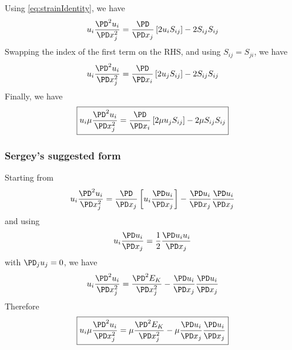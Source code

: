 \documentclass[11pt]{article}
\begin{document}
Using \ref{eq:strainIdentity}, we have
\begin{equation}
	u_i \frac{\PD^2 u_i}{\PD x_j^2} = 
	\frac{\PD}{\PD x_j} \left[ 2 u_i S_{ij} \right] - 
	2 S_{ij} S_{ij}
\end{equation}
Swapping the index of the first term on the RHS, and using $S_{ij}=S_{ji}$, we have
\begin{equation}
	u_i \frac{\PD^2 u_i}{\PD x_j^2} = 
	\frac{\PD}{\PD x_i} \left[ 2 u_j S_{ij} \right] - 
	2 S_{ij} S_{ij}
\end{equation}
Finally, we have
\begin{equation}
	\boxed{
	u_i \mu \frac{\PD^2 u_i}{\PD x_j^2} = 
	\frac{\PD}{\PD x_i} \left[ 2 \mu u_j S_{ij} \right] - 
	2 \mu S_{ij} S_{ij}
	}
\end{equation}

\subsubsection{Sergey's suggested form}
Starting from 
\begin{equation}
	u_i \frac{\PD^2 u_i}{\PD x_j^2} = 
	\frac{\PD}{\PD x_j} \left[ u_i \frac{\PD u_i}{\PD x_j} \right] - 
	\frac{\PD u_i}{\PD x_j}\frac{\PD u_i}{\PD x_j}
\end{equation}
and using 
\begin{equation}
	u_i \frac{\PD u_i}{\PD x_j} = 
	\frac{1}{2} \frac{\PD u_i u_i}{\PD x_j}
\end{equation}
with $\PD_j u_j = 0$, we have
\begin{equation}
	u_i \frac{\PD^2 u_i}{\PD x_j^2} = 
	\frac{\PD^2 E_K}{\PD x_j^2} - 
	\frac{\PD u_i}{\PD x_j}\frac{\PD u_i}{\PD x_j}
\end{equation}
Therefore
\begin{equation}
	\boxed{
	u_i \mu \frac{\PD^2 u_i}{\PD x_j^2} = 
	\mu \frac{\PD^2 E_K}{\PD x_j^2} - 
	\mu \frac{\PD u_i}{\PD x_j}\frac{\PD u_i}{\PD x_j}
	}
\end{equation}
\end{document}
